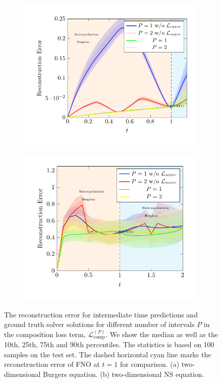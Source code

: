 \documentclass{article}
\theoremstyle{plain}
\theoremstyle{definition}
\theoremstyle{remark}
\newcommand{\lcomp}{{{\mathcal{L}}^{(P)}_{\text{comp}}}}
\begin{document}
\begin{figure}[t]
    \centering

\begin{subfigure}{.495\linewidth}
  \centering
 \includegraphics[height=0.8\linewidth]{figures/burgers2d_error_over_time.pdf}
  \caption{}
  \label{fig:interpolateburgers2d}
\end{subfigure}%
\hfill%
\begin{subfigure}{.495\linewidth}
  \centering
 \includegraphics[height=0.75\linewidth]{figures/navier2d_error_over_time.pdf}
  \caption{}
  \label{fig:interpolatenavier2d}
\end{subfigure}
    \caption{ The reconstruction error for intermediate time predictions and ground truth solver solutions for different number of intervals $P$ in the composition loss term, $\lcomp$. We show the median as well as the 10th, 25th, 75th and 90th percentiles. The statistics is based on 100 samples on the test set. The dashed horizontal cyan line marks the reconstruction error of FNO at $t=1$ for comparison. (a) two-dimensional Burgers equation. (b) two-dimensional NS equation.}
    \label{fig:interpolate}
\end{figure}
\end{document}
